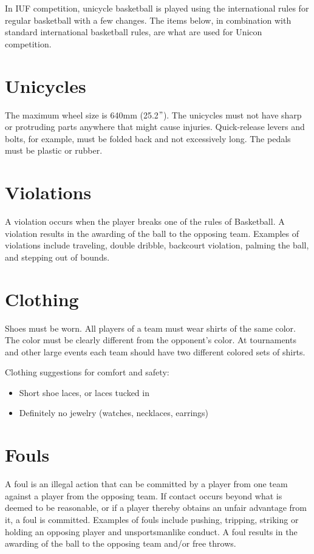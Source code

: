 
In IUF competition, unicycle basketball is played using the international rules for regular basketball with a few changes.
The items below, in combination with standard international basketball rules, are what are used for Unicon competition.

\section{Unicycles}
The maximum wheel size is 640mm (25.2$"$).
The unicycles must not have sharp or protruding parts anywhere that might
cause injuries.
Quick-release levers and bolts, for example, must be folded back and not excessively long.
The pedals must be plastic or rubber.

\section{Violations}
A violation occurs when the player breaks one of the rules of Basketball.
A violation results in the awarding of the ball to the opposing team.
Examples of violations include traveling, double dribble, backcourt violation, palming the ball, and stepping out of bounds.

\section{Clothing}
Shoes must be worn.
All players of a team must wear shirts of the same color.
The color must be clearly different from the opponent's color.
At tournaments and other large events each team should have two different colored sets of shirts.

Clothing suggestions for comfort and safety:
\begin{itemize}
\item Short shoe laces, or laces tucked in
\item Definitely no jewelry (watches, necklaces, earrings)
\end{itemize}

\section{Fouls}
A foul is an illegal action that can be committed by a player from one team against a player from the opposing team.
If contact occurs beyond what is deemed to be reasonable, or if a player thereby obtains an unfair advantage from it, a foul is committed.
Examples of fouls include pushing, tripping, striking or holding an opposing player and unsportsmanlike conduct.
A foul results in the awarding of the ball to the opposing team and/or free throws.

